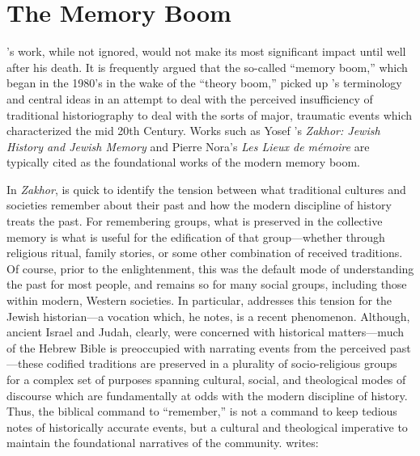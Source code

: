 \hypertarget{the-memory-boom}{%
\section{The Memory Boom}\label{the-memory-boom}}

\halbwachs's work, while not ignored, would not make its
most significant impact until well after his death. It is frequently
argued that the so-called ``memory boom,'' which began in the 1980's in
the wake of the ``theory boom,'' picked up \halbwachs's
terminology and central ideas in an attempt to deal with the perceived
insufficiency of traditional historiography to deal with the sorts of
major, traumatic events which characterized the mid 20th
Century.\autocites[1--2]{galinsky_galinsky2016}[See also][29--36. One
cannot help but speculate that---at least in the English-speaking
world---the translation of \emph{The Collective Memory} in 1980
contributed to the popularity of \halbwachs's
terminology.]{olick_olick-etal2011} Works such as Yosef
\yerushalmi's \emph{Zakhor: Jewish History and Jewish
Memory} and Pierre Nora's \emph{Les Lieux de mémoire} are typically
cited as the foundational works of the modern memory
boom.\autocites[112--113]{klein2011}{yerushalmi1989}[Nora's massive
project has been abridged and translated into English as][]{nora1996}

In \emph{Zakhor}, \yerushalmi is quick to identify the
tension between what traditional cultures and societies remember about
their past and how the modern discipline of history treats the past. For
remembering groups, what is preserved in the collective memory is what
is useful for the edification of that group---whether through religious
ritual, family stories, or some other combination of received
traditions. Of course, prior to the enlightenment, this was the default
mode of understanding the past for most people, and remains so for many
social groups, including those within modern, Western societies. In
particular, \yerushalmi addresses this tension for the
Jewish historian---a vocation which, he notes, is a recent phenomenon.
Although, ancient Israel and Judah, clearly, were concerned with
historical matters---much of the Hebrew Bible is preoccupied with
narrating events from the perceived past---these codified traditions are
preserved in a plurality of socio-religious groups for a complex set of
purposes spanning cultural, social, and theological modes of discourse
which are fundamentally at odds with the modern discipline of history.
Thus, the biblical command to ``remember,'' is not a command to keep
tedious notes of historically accurate events, but a cultural and
theological imperative to maintain the foundational narratives of the
community. \yerushalmi writes:

